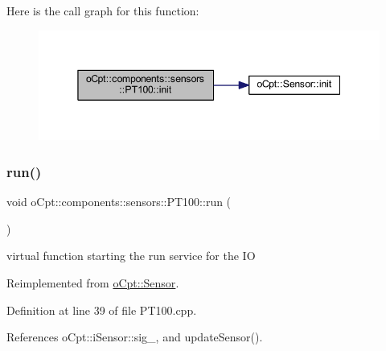 Here is the call graph for this function\+:\nopagebreak
\begin{figure}[H]
\begin{center}
\leavevmode
\includegraphics[width=345pt]{classo_cpt_1_1components_1_1sensors_1_1_p_t100_a296d0c3c2a55df465e127462c8c30215_cgraph}
\end{center}
\end{figure}
\hypertarget{classo_cpt_1_1components_1_1sensors_1_1_p_t100_a41dfc55a4be7993949feeb5ac013690d}{}\label{classo_cpt_1_1components_1_1sensors_1_1_p_t100_a41dfc55a4be7993949feeb5ac013690d} 
\subsubsection{\texorpdfstring{run()}{run()}}
{\footnotesize\ttfamily void o\+Cpt\+::components\+::sensors\+::\+P\+T100\+::run (\begin{DoxyParamCaption}{ }\end{DoxyParamCaption})\hspace{0.3cm}{\ttfamily [virtual]}}

virtual function starting the run service for the IO 

Reimplemented from \hyperlink{classo_cpt_1_1_sensor_aef25b0e5f3a8358ee81c97c73909fbe6}{o\+Cpt\+::\+Sensor}.



Definition at line 39 of file P\+T100.\+cpp.



References o\+Cpt\+::i\+Sensor\+::sig\+\_\+, and update\+Sensor().

